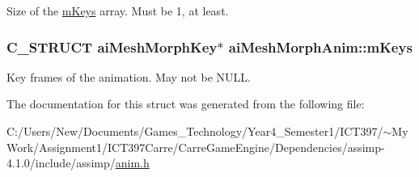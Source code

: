 Size of the \hyperlink{structai_mesh_morph_anim_0d4f98ee7eb4e2aaabf31eba48bd14c2}{mKeys} array. Must be 1, at least. \hypertarget{structai_mesh_morph_anim_0d4f98ee7eb4e2aaabf31eba48bd14c2}{
\subsubsection[mKeys]{\setlength{\rightskip}{0pt plus 5cm}C\_\-STRUCT {\bf aiMeshMorphKey}$\ast$ {\bf aiMeshMorphAnim::mKeys}}}
\label{structai_mesh_morph_anim_0d4f98ee7eb4e2aaabf31eba48bd14c2}


Key frames of the animation. May not be NULL. 

The documentation for this struct was generated from the following file:\begin{CompactItemize}
\item 
C:/Users/New/Documents/Games\_\-Technology/Year4\_\-Semester1/ICT397/$\sim$My Work/Assignment1/ICT397Carre/CarreGameEngine/Dependencies/assimp-4.1.0/include/assimp/\hyperlink{anim_8h}{anim.h}\end{CompactItemize}
